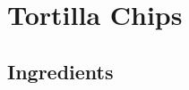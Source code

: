 \thispagestyle{fancy}
\section{Tortilla Chips}
\AddToShipoutPicture*{\TortillaChips}

\subsection*{Ingredients}